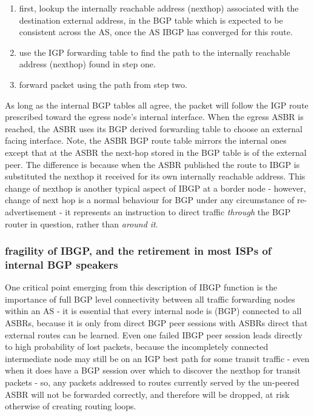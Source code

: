 \begin{enumerate}
	\item first, lookup the internally reachable address (nexthop) associated with the destination external address, in the BGP table which is expected to be consistent across the AS, once the AS IBGP has converged for this route.
	\item use the IGP forwarding table to find the path to the internally reachable address (nexthop) found in step one.
	\item  forward packet using the path from step two.
\end{enumerate}

As long as the internal BGP tables all agree, the packet will follow the IGP
route prescribed toward the egress node's internal interface.
When the egress ASBR is reached, the ASBR uses its BGP derived forwarding table
to choose an external facing interface.  Note, the ASBR BGP route table mirrors
the internal ones except that at the ASBR the next-hop stored in the BGP table
is of the external peer.  The difference is because when the ASBR published the
route to IBGP is substituted the nexthop it received for its own internally
reachable address.  This change of nexthop is another typical aspect of IBGP at
a border node - however, change of next hop is a normal behaviour for BGP under
any circumstance of re-advertisement - it represents an instruction to direct
traffic \emph{through} the BGP router in question, rather than \emph{around	it}.

\subsubsection{fragility of IBGP, and the retirement in most ISPs of internal BGP speakers}

One critical point emerging from this description of IBGP function is the
importance of full BGP level connectivity between all traffic forwarding nodes
within an AS - it is essential that every internal node is (BGP) connected to
all ASBRs, because it is only from direct BGP peer sessions with ASBRs direct
that external routes can be learned.  Even one failed IBGP peer session leads
directly to high probability of lost packets, because the incompletely connected intermediate node
may still be on an IGP best path for some transit traffic - even when it does have a BGP session over
which to discover the nexthop for transit packets - so, any packets addressed to
routes currently served by the un-peered ASBR will not be forwarded correctly,
and therefore will be dropped, at risk otherwise of creating routing loops.

